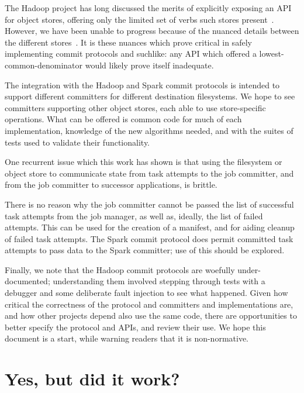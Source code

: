 \documentclass[conference]{IEEEtran}
\begin{document}
The Hadoop project has long discussed the merits of explicitly
exposing an API for object stores, offering only the limited
set of verbs such stores present\ \cite{HADOOP-9565}.
However, we have been unable to progress because of the nuanced details
between the different stores\ \cite{S3, WASB, ADL, GCS}.
It is these nuances which prove critical in safely implementing
commit protocols and suchlike: any API which offered a lowest-common-denominator
would likely prove itself inadequate.

The integration with the Hadoop and Spark commit protocols is intended
to support different committers for different destination filesystems.
We hope to see committers supporting other object stores, each
able to use store-specific operations.
What can be offered is common code for much of each implementation,
knowledge of the new algorithms needed, and
with the suites of tests used to validate their functionality.

One recurrent issue which this work has shown is that using the
filesystem or object store to communicate state from task attempts
to the job committer, and from the job committer to successor
applications, is brittle.

There is no reason why the job committer cannot be passed the list of
successful task attempts from the job manager, as well as, ideally,
the list of failed attempts.
This can be used for the creation of a manifest, and for aiding cleanup
of failed task attempts.
The Spark commit protocol does permit committed task attempts to pass data
to the Spark committer;
use of this should be explored.


Finally, we note that the Hadoop commit protocols are woefully under-documented;
understanding them involved stepping through tests with a debugger and
some deliberate fault injection to see what happened.
Given how critical the correctness of the protocol and committers and implementations
are, and how other projects depend also use the same code, there
are opportunities to better specify the protocol and APIs, and review
their use.
We hope this document is a start, while warning readers that it is non-normative.




\section{Yes, but did it work?}
\label{sec:production}
\end{document}
